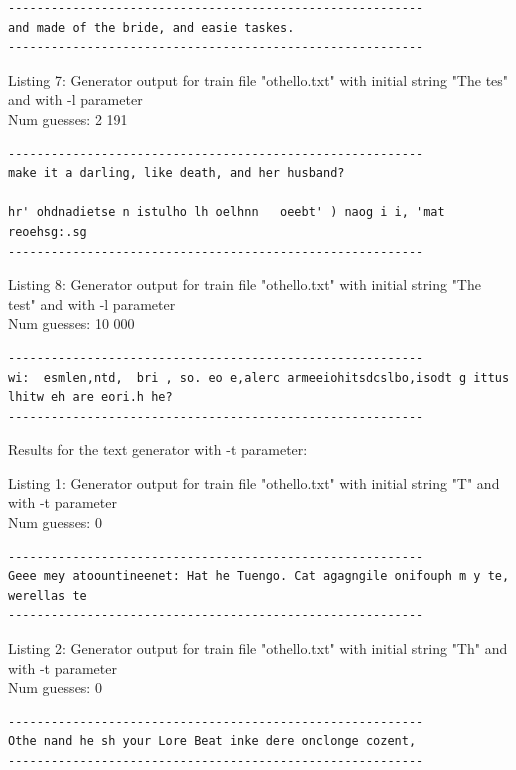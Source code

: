 \documentclass{article}
\begin{document}
\begin{lstlisting}
----------------------------------------------------------
and made of the bride, and easie taskes.
----------------------------------------------------------
\end{lstlisting}

Listing 7: Generator output for train file "othello.txt" with initial string "The tes" and with -l parameter
\\Num guesses: 2 191

\begin{lstlisting}
----------------------------------------------------------
make it a darling, like death, and her husband?

hr' ohdnadietse n istulho lh oelhnn   oeebt' ) naog i i, 'mat reoehsg:.sg
----------------------------------------------------------
\end{lstlisting}

Listing 8: Generator output for train file "othello.txt" with initial string "The test" and with -l parameter
\\Num guesses: 10 000

\begin{lstlisting}
----------------------------------------------------------
wi:  esmlen,ntd,  bri , so. eo e,alerc armeeiohitsdcslbo,isodt g ittus lhitw eh are eori.h he?
----------------------------------------------------------
\end{lstlisting}



Results for the text generator with -t parameter:


\hfill

Listing 1: Generator output for train file "othello.txt" with initial string "T" and with -t parameter
\\Num guesses: 0

\begin{lstlisting}
----------------------------------------------------------
Geee mey atoountineenet: Hat he Tuengo. Cat agagngile onifouph m y te, werellas te
----------------------------------------------------------
\end{lstlisting}

Listing 2: Generator output for train file "othello.txt" with initial string "Th" and with -t parameter
\\Num guesses: 0

\begin{lstlisting}
----------------------------------------------------------
Othe nand he sh your Lore Beat inke dere onclonge cozent,
----------------------------------------------------------
\end{lstlisting}
\end{document}
